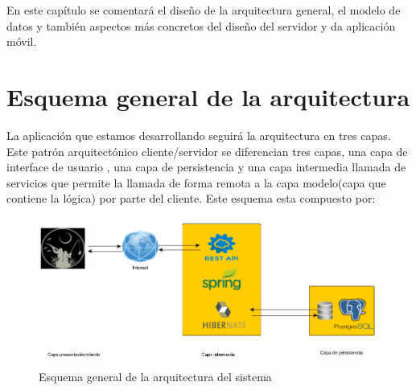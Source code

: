 

En este capítulo se comentará el diseño de la arquitectura general, el
modelo de datos y también aspectos más concretos del diseño del servidor y da aplicación
móvil.



\section{Esquema general de la arquitectura}
La aplicación que estamos desarrollando seguirá la arquitectura
en tres capas. Este patrón arquitectónico cliente/servidor se diferencian tres
capas, una capa de interface de usuario , una capa de persistencia
y una capa intermedia llamada de servicios que permite la llamada de forma remota a la capa modelo(capa que contiene la lógica) por parte del cliente. Este esquema esta compuesto por:




\begin{figure}[H]
		\centering
		\includegraphics[width=\textwidth] {arquitectura2.png}
		\caption{Esquema general de la arquitectura del sistema }\label{fig:arquitectura2}
	\end{figure}


